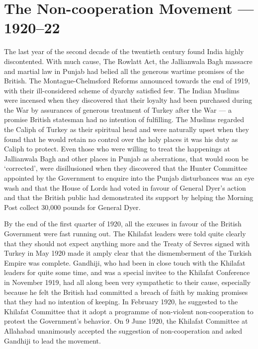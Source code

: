\chapter{The Non-cooperation Movement --- 1920--22}
\begin{multicols}{2}

The last year of the second decade of the twentieth century found India highly discontented. With much cause, The Rowlatt Act, the Jallianwala Bagh massacre and martial law in Punjab had belied all the generous wartime promises of the British. The Montague-Chelmsford Reforms announced towards the end of 1919, with their ill-considered scheme of dyarchy satisfied few. The Indian Muslims were incensed when they discovered that their loyalty had been purchased during the War by assurances of generous treatment of Turkey after the War --- a promise British statesman had no intention of fulfilling. The Muslims regarded the Caliph of Turkey as their spiritual head and were naturally upset when they found that he would retain no control over the holy places it was his duty as Caliph to protect. Even those who were willing to treat the happenings at Jallianwala Bagh and other places in Punjab as aberrations, that would soon be `corrected', were disillusioned when they discovered that the Hunter Committee appointed by the Government to enquire into the Punjab disturbances was an eye wash and that the House of Lords had voted in favour of General Dyer's action and that the British public had demonstrated its support by helping the Morning Post collect 30,000 pounds for General Dyer. 

By the end of the first quarter of 1920, all the excuses in favour of the British Government were fast running out. The Khilafat leaders were told quite clearly that they should not expect anything more and the Treaty of Sevres signed with Turkey in May 1920 made it amply clear that the dismemberment of the Turkish Empire was complete. Gandhiji, who had been in close touch with the Khilafat leaders for quite some time, and was a special invitee to the Khilafat Conference in November 1919, had all along been very sympathetic to their cause, especially because he felt the British had committed a breach of faith by making promises that they had no intention of keeping. In February 1920, he suggested to the Khilafat Committee that it adopt a programme of non-violent non-cooperation to protest the Government's behavior. On 9 June 1920, the Khilafat Committee at Allahabad unanimously accepted the suggestion of non-cooperation and asked Gandhiji to lead the movement. 


\end{multicols}
